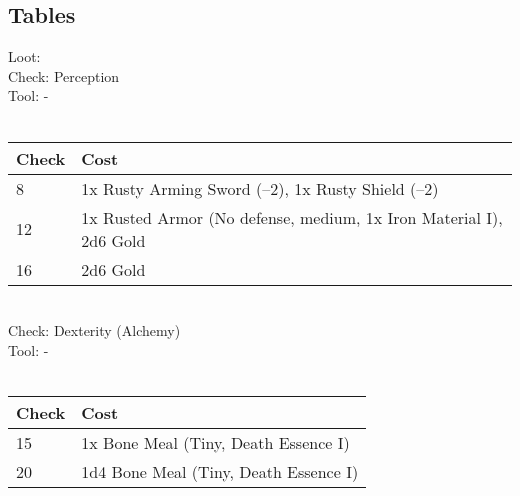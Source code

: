 \subsection{Tables}
Loot:\\
Check: Perception\\
Tool: -\\
\\
\begin{minipage}{0.8\textwidth}
    \begin{tabular}{|l | l|}
        \hline
        Check & Cost\\
        \hline
        8 & 1x Rusty Arming Sword (--2), 1x Rusty Shield (--2)\\
        12 & 1x Rusted Armor (No defense, medium, 1x Iron Material I), 2d6 Gold\\
        16 & 2d6 Gold\\
        \hline
    \end{tabular}
\end{minipage}
\\
Check: Dexterity (Alchemy)\\
Tool: -\\
\\
\begin{minipage}{0.8\textwidth}
    \begin{tabular}{|l | l|}
        \hline
        Check & Cost\\
        \hline
        15 & 1x Bone Meal (Tiny, Death Essence I)\\
        20 & 1d4 Bone Meal (Tiny, Death Essence I)\\
        \hline
    \end{tabular}
\end{minipage}
\pagebreak